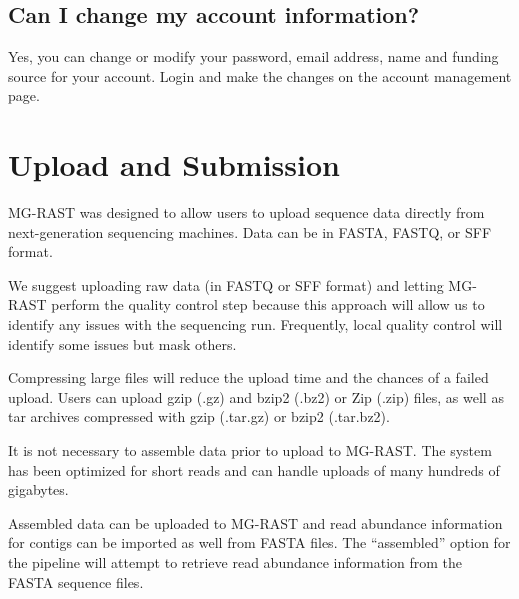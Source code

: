 \documentclass[12pt,fullpage]{report}
\begin{document}
\subsection*{Can I change my account information?}
Yes, you can change or modify your password, email address, name and funding source for your account. Login and make the changes on the account management page.









\section{Upload and Submission}
\label{section:Uploading_to_MG-RAST}

MG-RAST was designed to allow users to upload sequence data directly from next-generation sequencing machines. Data can be in FASTA, FASTQ, or SFF format.

We suggest uploading raw data (in FASTQ or SFF format) and letting MG-RAST perform the quality control step because
this approach will allow us to identify any issues with the sequencing run. Frequently, local quality control will identify some
issues but mask others.

Compressing large files will reduce the upload time and the chances of a failed upload. Users can upload gzip (.gz) and bzip2 (.bz2) or Zip (.zip) files, as well as tar archives compressed with gzip (.tar.gz) or bzip2 (.tar.bz2).

It is not necessary to assemble data prior to upload to MG-RAST. The system has been optimized for short reads and can handle uploads of many hundreds of gigabytes.

Assembled data can be uploaded to MG-RAST and read abundance information for contigs can be imported as well from FASTA files.
The ``assembled'' option for the pipeline will attempt to retrieve read abundance information from the FASTA sequence files.
\end{document}
